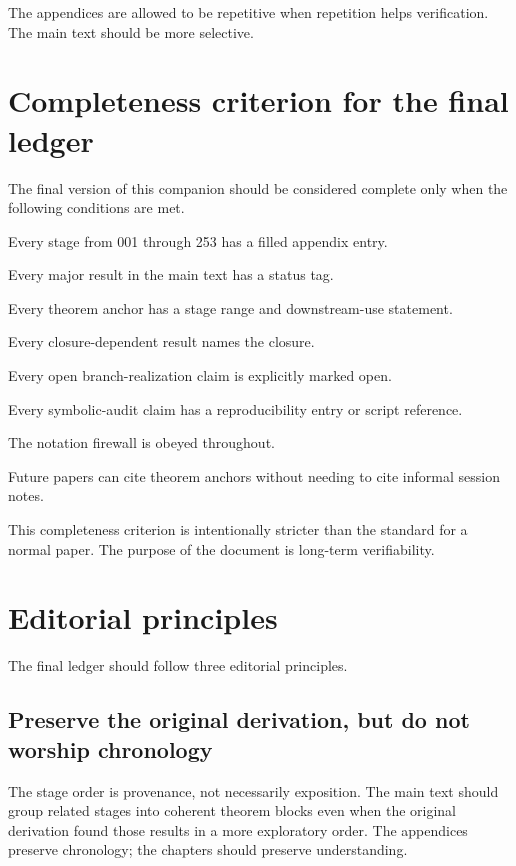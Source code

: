 The appendices are allowed to be repetitive when repetition helps verification.  The main text should be more selective.

\section{Completeness criterion for the final ledger}

The final version of this companion should be considered complete only when the following conditions are met.

\begin{verificationchecklist}
  \item Every stage from 001 through 253 has a filled appendix entry.
  \item Every major result in the main text has a status tag.
  \item Every theorem anchor has a stage range and downstream-use statement.
  \item Every closure-dependent result names the closure.
  \item Every open branch-realization claim is explicitly marked open.
  \item Every symbolic-audit claim has a reproducibility entry or script reference.
  \item The notation firewall is obeyed throughout.
  \item Future papers can cite theorem anchors without needing to cite informal session notes.
\end{verificationchecklist}

This completeness criterion is intentionally stricter than the standard for a normal paper.  The purpose of the document is long-term verifiability.

\section{Editorial principles}

The final ledger should follow three editorial principles.

\subsection{Preserve the original derivation, but do not worship chronology}

The stage order is provenance, not necessarily exposition.  The main text should group related stages into coherent theorem blocks even when the original derivation found those results in a more exploratory order.  The appendices preserve chronology; the chapters should preserve understanding.

